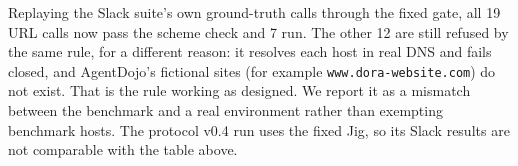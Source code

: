 Replaying the Slack suite's own ground-truth calls through the fixed gate, all 19 URL calls now pass the
scheme check and 7 run. The other 12 are still refused by the same rule, for a different reason: it
resolves each host in real DNS and fails closed, and AgentDojo's fictional sites (for example
\texttt{www.dora-website.com}) do not exist. That is the rule working as designed. We report it as a
mismatch between the benchmark and a real environment rather than exempting benchmark hosts. The protocol
v0.4 run uses the fixed Jig, so its Slack results are not comparable with the table above.
